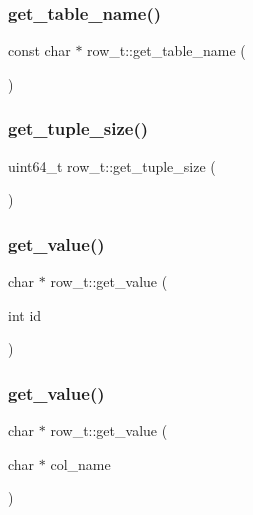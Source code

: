 \subsubsection{\texorpdfstring{get\+\_\+table\+\_\+name()}{get\_table\_name()}}
{\footnotesize\ttfamily const char $\ast$ row\+\_\+t\+::get\+\_\+table\+\_\+name (\begin{DoxyParamCaption}{ }\end{DoxyParamCaption})}

\mbox{\label{classrow__t_ab524208335b31ac56c95f9695365967b}} 
\subsubsection{\texorpdfstring{get\+\_\+tuple\+\_\+size()}{get\_tuple\_size()}}
{\footnotesize\ttfamily uint64\+\_\+t row\+\_\+t\+::get\+\_\+tuple\+\_\+size (\begin{DoxyParamCaption}{ }\end{DoxyParamCaption})}

\mbox{\label{classrow__t_a92eba387d775a5d6bb975bdbee3fd0ef}} 
\subsubsection{\texorpdfstring{get\+\_\+value()}{get\_value()}\hspace{0.1cm}{\footnotesize\ttfamily [1/2]}}
{\footnotesize\ttfamily char $\ast$ row\+\_\+t\+::get\+\_\+value (\begin{DoxyParamCaption}\item[{int}]{id }\end{DoxyParamCaption})}

\mbox{\label{classrow__t_ab984e074eab7fca2c3f58169289ccb42}} 
\subsubsection{\texorpdfstring{get\+\_\+value()}{get\_value()}\hspace{0.1cm}{\footnotesize\ttfamily [2/2]}}
{\footnotesize\ttfamily char $\ast$ row\+\_\+t\+::get\+\_\+value (\begin{DoxyParamCaption}\item[{char $\ast$}]{col\+\_\+name }\end{DoxyParamCaption})}

